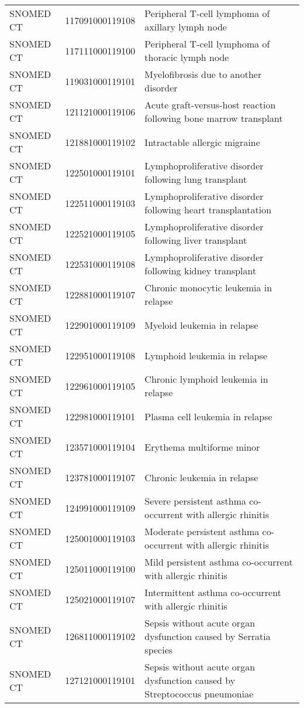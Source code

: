 \begin{longtable}{p{}p{}p{}}
  SNOMED CT & 117091000119108 & Peripheral T-cell lymphoma of axillary lymph node \\ 
  SNOMED CT & 117111000119100 & Peripheral T-cell lymphoma of thoracic lymph node \\ 
  SNOMED CT & 119031000119101 & Myelofibrosis due to another disorder \\ 
  SNOMED CT & 121121000119106 & Acute graft-versus-host reaction following bone marrow transplant \\ 
  SNOMED CT & 121881000119102 & Intractable allergic migraine \\ 
  SNOMED CT & 122501000119101 & Lymphoproliferative disorder following lung transplant \\ 
  SNOMED CT & 122511000119103 & Lymphoproliferative disorder following heart transplantation \\ 
  SNOMED CT & 122521000119105 & Lymphoproliferative disorder following liver transplant \\ 
  SNOMED CT & 122531000119108 & Lymphoproliferative disorder following kidney transplant \\ 
  SNOMED CT & 122881000119107 & Chronic monocytic leukemia in relapse \\ 
  SNOMED CT & 122901000119109 & Myeloid leukemia in relapse \\ 
  SNOMED CT & 122951000119108 & Lymphoid leukemia in relapse \\ 
  SNOMED CT & 122961000119105 & Chronic lymphoid leukemia in relapse \\ 
  SNOMED CT & 122981000119101 & Plasma cell leukemia in relapse \\ 
  SNOMED CT & 123571000119104 & Erythema multiforme minor \\ 
  SNOMED CT & 123781000119107 & Chronic leukemia in relapse \\ 
  SNOMED CT & 124991000119109 & Severe persistent asthma co-occurrent with allergic rhinitis \\ 
  SNOMED CT & 125001000119103 & Moderate persistent asthma co-occurrent with allergic rhinitis \\ 
  SNOMED CT & 125011000119100 & Mild persistent asthma co-occurrent with allergic rhinitis \\ 
  SNOMED CT & 125021000119107 & Intermittent asthma co-occurrent with allergic rhinitis \\ 
  SNOMED CT & 126811000119102 & Sepsis without acute organ dysfunction caused by Serratia species \\ 
  SNOMED CT & 127121000119101 & Sepsis without acute organ dysfunction caused by Streptococcus pneumoniae \\ 

\end{longtable}
